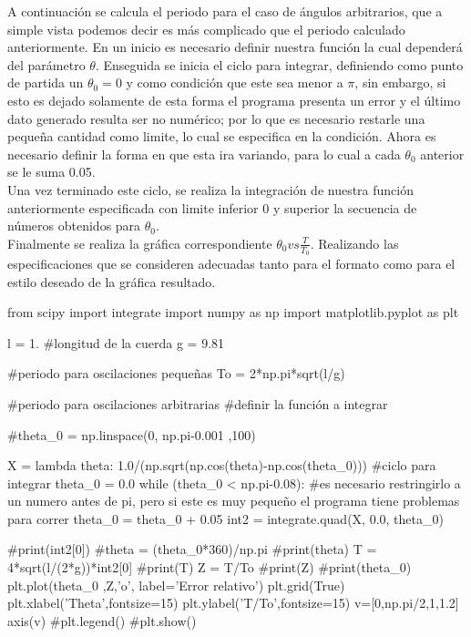 \documentclass[12pt]{article}
\begin{document}
A continuación se calcula el periodo para el caso de ángulos arbitrarios, que a simple vista podemos decir es más complicado que el periodo calculado anteriormente. En un inicio es necesario definir nuestra función la cual dependerá del parámetro $\theta$. Enseguida se inicia el ciclo para integrar, definiendo como punto de partida un $\theta_0 = 0$ y como condición que este sea menor a $\pi$, sin embargo, si esto es dejado solamente de esta forma el programa presenta un error y el último dato generado resulta ser no numérico; por lo que es necesario restarle una pequeña cantidad como limite, lo cual se especifica en la condición. Ahora es necesario definir la forma en que esta ira variando, para lo cual a cada $\theta_0$ anterior se le suma 0.05.\\

Una vez terminado este ciclo, se realiza la integración de nuestra función anteriormente especificada con limite inferior 0 y superior la secuencia de números obtenidos para $\theta_0$.\\

Finalmente se realiza la gráfica correspondiente $\theta_0 vs \frac{T}{T_0}$. Realizando las especificaciones que se consideren adecuadas tanto para el formato como para el estilo deseado de la gráfica resultado.

\begin{boxedverbatim}
from scipy import integrate
import numpy as np
import matplotlib.pyplot as plt

l = 1. #longitud de la cuerda
g = 9.81

#periodo para oscilaciones pequeñas
To = 2*np.pi*sqrt(l/g) 

#periodo para oscilaciones arbitrarias
#definir la función a integrar

#theta_0 = np.linspace(0, np.pi-0.001 ,100)

X = lambda theta: 1.0/(np.sqrt(np.cos(theta)-np.cos(theta_0)))
#ciclo para integrar
theta_0 = 0.0
while (theta_0 < np.pi-0.08): 
#es necesario restringirlo a un numero antes de pi, 
pero si este es muy pequeño 
el programa tiene problemas para correr
    theta_0 = theta_0 + 0.05
    int2 = integrate.quad(X, 0.0, theta_0)    
    
    #print(int2[0])
    #theta = (theta_0*360)/np.pi
    #print(theta)
    T = 4*sqrt(l/(2*g))*int2[0]
    #print(T)
    Z = T/To
    #print(Z)
    #print(theta_0)
    plt.plot(theta_0 ,Z,'o', label='Error relativo')
    plt.grid(True)
    plt.xlabel('Theta',fontsize=15)
    plt.ylabel('T/To',fontsize=15)
    v=[0,np.pi/2,1,1.2]
    axis(v)
    #plt.legend()
    #plt.show()
\end{boxedverbatim}
\end{document}
